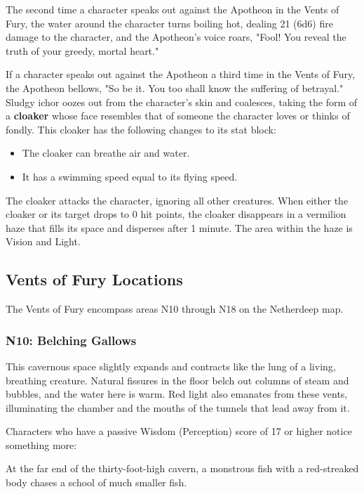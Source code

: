\documentclass[letterpaper, 11pt, bg=full, twocolumn]{dndbook}
\begin{document}
The second time a character speaks out against the Apotheon in the Vents of Fury, the water around the character turns boiling hot, dealing 21 (6d6) fire damage to the character, and the Apotheon's voice roars, "Fool! You reveal the truth of your greedy, mortal heart."

If a character speaks out against the Apotheon a third time in the Vents of Fury, the Apotheon bellows, "So be it. You too shall know the suffering of betrayal." Sludgy ichor oozes out from the character's skin and coalesces, taking the form of a \textbf{cloaker} whose face resembles that of someone the character loves or thinks of fondly. This cloaker has the following changes to its stat block:

\begin{itemize}
\item The cloaker can breathe air and water.
\item It has a swimming speed equal to its flying speed.
\end{itemize}

The cloaker attacks the character, ignoring all other creatures. When either the cloaker or its target drops to 0 hit points, the cloaker disappears in a vermilion haze that fills its space and disperses after 1 minute. The area within the haze is Vision and Light.

\subsection{Vents of Fury Locations}

The Vents of Fury encompass areas N10 through N18 on the Netherdeep map.

\subsubsection{N10: Belching Gallows}

\begin{DndReadAloud}
This cavernous space slightly expands and contracts like the lung of a living, breathing creature. Natural fissures in the floor belch out columns of steam and bubbles, and the water here is warm. Red light also emanates from these vents, illuminating the chamber and the mouths of the tunnels that lead away from it.
\end{DndReadAloud}

Characters who have a passive Wisdom (Perception) score of 17 or higher notice something more:

\begin{DndReadAloud}
At the far end of the thirty-foot-high cavern, a monstrous fish with a red-streaked body chases a school of much smaller fish.
\end{DndReadAloud}
\end{document}
